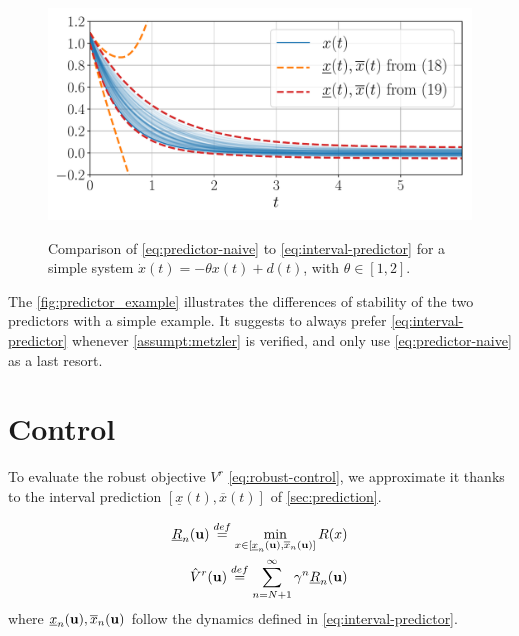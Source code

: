 \documentclass{article}
\begin{document}
\begin{figure}[tp]
	\centering
	{\includegraphics[trim={0 0.6cm 0 0.4cm}, clip, width=\linewidth]{img/interval-predictor}}
    \vspace{-0.5cm}
	\caption{Comparison of \eqref{eq:predictor-naive} to \eqref{eq:interval-predictor} for a simple system $\dot{x}(t)=-\theta x(t)+d(t)$, with $\theta\in[1, 2]$.}
	\label{fig:predictor_example}
\end{figure}

The \autoref{fig:predictor_example} illustrates the differences of stability of the two predictors with a simple example. It suggests to always prefer \eqref{eq:interval-predictor} whenever \autoref{assumpt:metzler} is verified, and only use \eqref{eq:predictor-naive} as a last resort.


\section{Control}

\label{sec:control}
To evaluate the robust objective $V^r$ \eqref{eq:robust-control}, we approximate it thanks to the interval prediction $[\underline{x}(t), \overline{x}(t)]$ of \autoref{sec:prediction}.

\begin{definition}
\begin{align}
\underline{R}_n(\mathbf{u}) \stackrel{def}{=} \min_{x\in[\underline{x}_n(\mathbf{u}), \overline{x}_n(\mathbf{u})]}  R(x) \label{eq:pessimistic-rewards} \\
\hat{V}^r(\mathbf{u}) \stackrel{def}{=} \sum_{n=N+1}^\infty \gamma^n \underline{R}_n(\mathbf{u}) \label{eq:surrogate_objective}
\end{align}
where $\underline{x}_n(\mathbf{u}), \overline{x}_n(\mathbf{u})$ follow the dynamics defined in \eqref{eq:interval-predictor}.
\end{definition}
\end{document}
